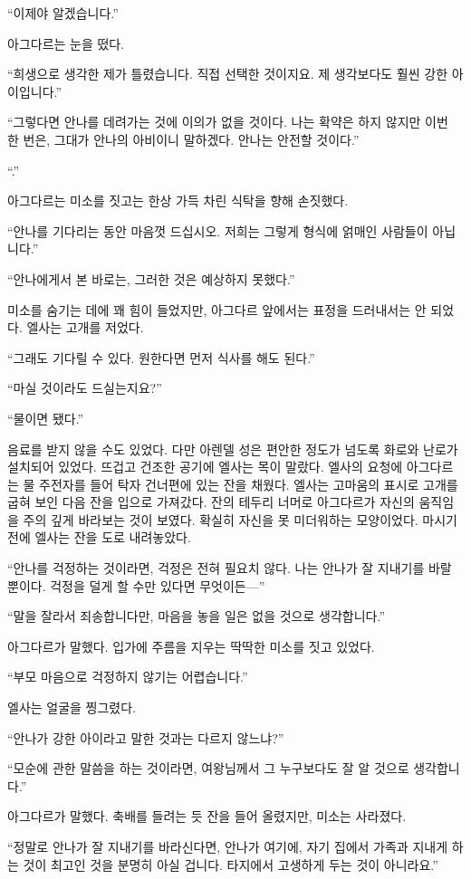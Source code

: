 ``이제야 알겠습니다.''

아그다르는 눈을 떴다.

``희생으로 생각한 제가 틀렸습니다. 직접 선택한 것이지요. 제 생각보다도 훨씬 강한 아이입니다.''

``그렇다면 안나를 데려가는 것에 이의가 없을 것이다. 나는 확약은 하지 않지만 이번 한 번은, 그대가 안나의 아비이니 말하겠다. 안나는 안전할 것이다.''

``.''

아그다르는 미소를 짓고는 한상 가득 차린 식탁을 향해 손짓했다.

``안나를 기다리는 동안 마음껏 드십시오. 저희는 그렇게 형식에 얽매인 사람들이 아닙니다.''

``안나에게서 본 바로는, 그러한 것은 예상하지 못했다.''

미소를 숨기는 데에 꽤 힘이 들었지만, 아그다르 앞에서는 표정을 드러내서는 안 되었다. 엘사는 고개를 저었다.

``그래도 기다릴 수 있다. 원한다면 먼저 식사를 해도 된다.''

``마실 것이라도 드실는지요?''

``물이면 됐다.''

음료를 받지 않을 수도 있었다. 다만 아렌델 성은 편안한 정도가 넘도록 화로와 난로가 설치되어 있었다. 뜨겁고 건조한 공기에 엘사는 목이 말랐다. 엘사의 요청에 아그다르는 물 주전자를 들어 탁자 건너편에 있는 잔을 채웠다. 엘사는 고마움의 표시로 고개를 굽혀 보인 다음 잔을 입으로 가져갔다. 잔의 테두리 너머로 아그다르가 자신의 움직임을 주의 깊게 바라보는 것이 보였다. 확실히 자신을 못 미더워하는 모양이었다. 마시기 전에 엘사는 잔을 도로 내려놓았다.

``안나를 걱정하는 것이라면, 걱정은 전혀 필요치 않다. 나는 안나가 잘 지내기를 바랄 뿐이다. 걱정을 덜게 할 수만 있다면 무엇이든—''

``말을 잘라서 죄송합니다만, 마음을 놓을 일은 없을 것으로 생각합니다.''

아그다르가 말했다. 입가에 주름을 지우는 딱딱한 미소를 짓고 있었다.

``부모 마음으로 걱정하지 않기는 어렵습니다.''

엘사는 얼굴을 찡그렸다.

``안나가 강한 아이라고 말한 것과는 다르지 않느냐?''

``모순에 관한 말씀을 하는 것이라면, 여왕님께서 그 누구보다도 잘 알 것으로 생각합니다.''

아그다르가 말했다. 축배를 들려는 듯 잔을 들어 올렸지만, 미소는 사라졌다.

``정말로 안나가 잘 지내기를 바라신다면, 안나가 여기에, 자기 집에서 가족과 지내게 하는 것이 최고인 것을 분명히 아실 겁니다. 타지에서 고생하게 두는 것이 아니라요.''

